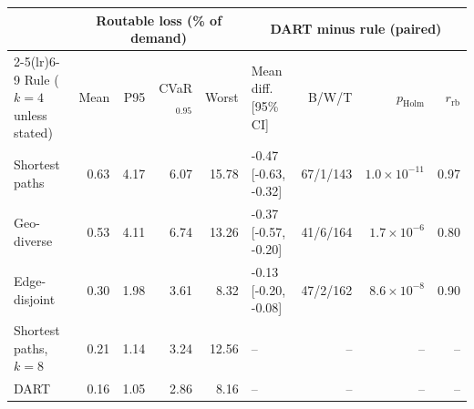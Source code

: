 \begin{tabular}{lrrrrlrrr}
\toprule
 & \multicolumn{4}{c}{Routable loss (\% of demand)} & \multicolumn{4}{c}{DART minus rule (paired)} \\
\cmidrule(lr){2-5}\cmidrule(lr){6-9}
Rule ($k=4$ unless stated) & Mean & P95 & CVaR$_{0.95}$ & Worst & Mean diff. [95\% CI] & B/W/T & $p_{\mathrm{Holm}}$ & $r_{\mathrm{rb}}$ \\
\midrule
Shortest paths & 0.63 & 4.17 & 6.07 & 15.78 & -0.47 [-0.63, -0.32] & 67/1/143 & $1.0\times10^{-11}$ & 0.97 \\
Geo-diverse & 0.53 & 4.11 & 6.74 & 13.26 & -0.37 [-0.57, -0.20] & 41/6/164 & $1.7\times10^{-6}$ & 0.80 \\
Edge-disjoint & 0.30 & 1.98 & 3.61 & 8.32 & -0.13 [-0.20, -0.08] & 47/2/162 & $8.6\times10^{-8}$ & 0.90 \\
Shortest paths, $k=8$ & 0.21 & 1.14 & 3.24 & 12.56 & -- & -- & -- & -- \\
DART & 0.16 & 1.05 & 2.86 & 8.16 & -- & -- & -- & -- \\
\bottomrule
\end{tabular}
